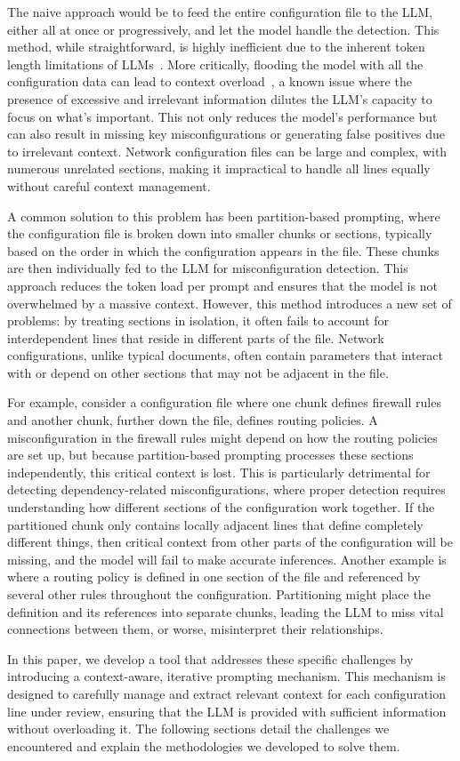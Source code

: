 The naive approach would be to feed the entire configuration file to the LLM, either all at once or progressively, and let the model handle the detection. This method, while straightforward, is highly inefficient due to the inherent token length limitations of LLMs~\cite{xue2024repeat,yu2024breaking,gu2023mamba}. More critically, flooding the model with all the configuration data can lead to context overload~\cite{lican,li2024long,qian2024long}, a known issue where the presence of excessive and irrelevant information dilutes the LLM’s capacity to focus on what’s important. This not only reduces the model’s performance but can also result in missing key misconfigurations or generating false positives due to irrelevant context. Network configuration files can be large and complex, with numerous unrelated sections, making it impractical to handle all lines equally without careful context management.

A common solution to this problem has been partition-based prompting, where the configuration file is broken down into smaller chunks or sections, typically based on the order in which the configuration appears in the file. These chunks are then individually fed to the LLM for misconfiguration detection. This approach reduces the token load per prompt and ensures that the model is not overwhelmed by a massive context. However, this method introduces a new set of problems: by treating sections in isolation, it often fails to account for interdependent lines that reside in different parts of the file. Network configurations, unlike typical documents, often contain parameters that interact with or depend on other sections that may not be adjacent in the file.

For example, consider a configuration file where one chunk defines firewall rules and another chunk, further down the file, defines routing policies. A misconfiguration in the firewall rules might depend on how the routing policies are set up, but because partition-based prompting processes these sections independently, this critical context is lost. This is particularly detrimental for detecting dependency-related misconfigurations, where proper detection requires understanding how different sections of the configuration work together. If the partitioned chunk only contains locally adjacent lines that define completely different things, then critical context from other parts of the configuration will be missing, and the model will fail to make accurate inferences.
Another example is where a routing policy is defined in one section of the file and referenced by several other rules throughout the configuration. Partitioning might place the definition and its references into separate chunks, leading the LLM to miss vital connections between them, or worse, misinterpret their relationships.

In this paper, we develop a tool that addresses these specific challenges by introducing a context-aware, iterative prompting mechanism. This mechanism is designed to carefully manage and extract relevant context for each configuration line under review, ensuring that the LLM is provided with sufficient information without overloading it. The following sections detail the challenges we encountered and explain the methodologies we developed to solve them.